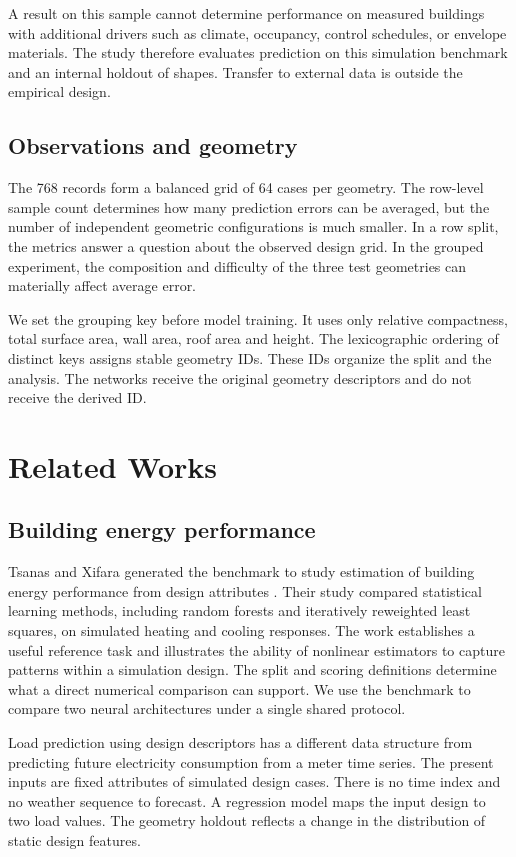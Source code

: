 \documentclass[11pt,twocolumn,letterpaper]{article}
\begin{document}
A result on this sample cannot determine performance on measured buildings with additional drivers such as climate, occupancy, control schedules, or envelope materials. The study therefore evaluates prediction on this simulation benchmark and an internal holdout of shapes. Transfer to external data is outside the empirical design.

\subsection{Observations and geometry}
The 768 records form a balanced grid of 64 cases per geometry. The row-level sample count determines how many prediction errors can be averaged, but the number of independent geometric configurations is much smaller. In a row split, the metrics answer a question about the observed design grid. In the grouped experiment, the composition and difficulty of the three test geometries can materially affect average error.

We set the grouping key before model training. It uses only relative compactness, total surface area, wall area, roof area and height. The lexicographic ordering of distinct keys assigns stable geometry IDs. These IDs organize the split and the analysis. The networks receive the original geometry descriptors and do not receive the derived ID.

\section{Related Works}
\subsection{Building energy performance}
Tsanas and Xifara generated the benchmark to study estimation of building energy performance from design attributes \cite{simulation,uci}. Their study compared statistical learning methods, including random forests and iteratively reweighted least squares, on simulated heating and cooling responses. The work establishes a useful reference task and illustrates the ability of nonlinear estimators to capture patterns within a simulation design. The split and scoring definitions determine what a direct numerical comparison can support. We use the benchmark to compare two neural architectures under a single shared protocol.

Load prediction using design descriptors has a different data structure from predicting future electricity consumption from a meter time series. The present inputs are fixed attributes of simulated design cases. There is no time index and no weather sequence to forecast. A regression model maps the input design to two load values. The geometry holdout reflects a change in the distribution of static design features.
\end{document}
